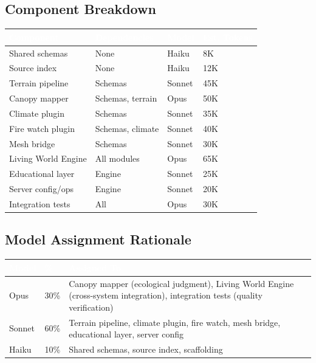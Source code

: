 \documentclass[11pt,letterpaper]{article}
\newcommand{\tableheader}[1]{\textbf{\sffamily\textcolor{white}{#1}}}
\begin{document}
\subsection{Component Breakdown}

\begin{center}
\begin{tabularx}{\textwidth}{L{3.2cm}L{2.5cm}C{1.5cm}C{1.8cm}}
\toprule
{}
\tableheader{Component} & \tableheader{Dependencies} & \tableheader{Model} & \tableheader{Est. Tokens} \\
\midrule
Shared schemas & None & Haiku & 8K \\
Source index & None & Haiku & 12K \\
Terrain pipeline & Schemas & Sonnet & 45K \\
Canopy mapper & Schemas, terrain & Opus & 50K \\
Climate plugin & Schemas & Sonnet & 35K \\
Fire watch plugin & Schemas, climate & Sonnet & 40K \\
Mesh bridge & Schemas & Sonnet & 30K \\
Living World Engine & All modules & Opus & 65K \\
Educational layer & Engine & Sonnet & 25K \\
Server config/ops & Engine & Sonnet & 20K \\
Integration tests & All & Opus & 30K \\
\bottomrule
\end{tabularx}
\end{center}

\subsection{Model Assignment Rationale}

\begin{center}
\begin{tabularx}{\textwidth}{C{1.5cm}C{1.2cm}X}
\toprule
{}
\tableheader{Model} & \tableheader{\%} & \tableheader{Assigned To} \\
\midrule
Opus & 30\% & Canopy mapper (ecological judgment), Living World Engine (cross-system integration), integration tests (quality verification) \\
Sonnet & 60\% & Terrain pipeline, climate plugin, fire watch, mesh bridge, educational layer, server config \\
Haiku & 10\% & Shared schemas, source index, scaffolding \\
\bottomrule
\end{tabularx}
\end{center}
\end{document}
